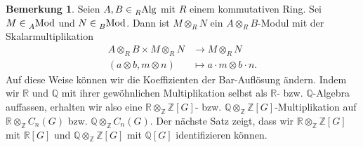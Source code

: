 \documentclass[a4paper,twoside,10pt]{scrreprt}
\newcommand{\Z}{\mathbb{Z}}
\newcommand{\Q}{\mathbb{Q}}
\newcommand{\R}{\mathbb{R}}
\theoremstyle{definition}
\newtheorem{bemerkung}[satz]{Bemerkung}
\begin{document}
\begin{bemerkung} Seien $A,B\in \prescript{}{R}{\text{Alg}}$ mit $R$ einem kommutativen Ring. Sei $M\in \prescript{}{A}{\text{Mod}}$ und $N\in\prescript{}{B}{\text{Mod}}$. Dann ist $M\otimes_{R}N$ ein $A\otimes_{R}B$-Modul mit der Skalarmultiplikation
\begin{align*}
A\otimes_{R}B\times M\otimes_{R}N&\to M\otimes_{R}N\\
(a\otimes b, m\otimes n)&\mapsto a\cdot m\otimes b\cdot n.
\end{align*}
Auf diese Weise können wir die Koeffizienten der Bar-Auflösung ändern. Indem wir $\R$ und $\Q$ mit ihrer gewöhnlichen Multiplikation selbst als $\R$- bzw. $\Q$-Algebra auffassen, erhalten wir also eine $\R\otimes_{\Z}\Z[G]$- bzw. $\Q\otimes_{\Z}\Z[G]$-Multiplikation auf $\R\otimes_{\Z}C_n(G)$ bzw. $\Q\otimes_{\Z}C_n(G)$. Der nächste Satz zeigt, dass wir $\R\otimes_{\Z}\Z[G]$ mit $\R[G]$ und $\Q\otimes_{\Z}\Z[G]$ mit $\Q[G]$ identifizieren können.
\end{bemerkung}
\end{document}
